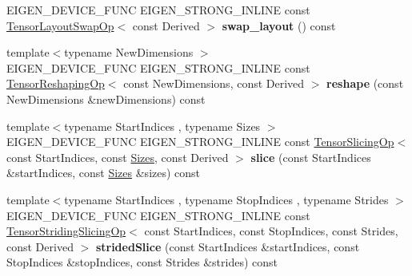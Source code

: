 \begin{DoxyCompactItemize}
E\+I\+G\+E\+N\+\_\+\+D\+E\+V\+I\+C\+E\+\_\+\+F\+U\+NC E\+I\+G\+E\+N\+\_\+\+S\+T\+R\+O\+N\+G\+\_\+\+I\+N\+L\+I\+NE const \hyperlink{class_eigen_1_1_tensor_layout_swap_op}{Tensor\+Layout\+Swap\+Op}$<$ const Derived $>$ {\bfseries swap\+\_\+layout} () const
\item 
\mbox{\label{class_eigen_1_1_tensor_base_3_01_derived_00_01_read_only_accessors_01_4_a78ac788b70a20612b37ae9b24671ecc4}} 
{\footnotesize template$<$typename New\+Dimensions $>$ }\\E\+I\+G\+E\+N\+\_\+\+D\+E\+V\+I\+C\+E\+\_\+\+F\+U\+NC E\+I\+G\+E\+N\+\_\+\+S\+T\+R\+O\+N\+G\+\_\+\+I\+N\+L\+I\+NE const \hyperlink{class_eigen_1_1_tensor_reshaping_op}{Tensor\+Reshaping\+Op}$<$ const New\+Dimensions, const Derived $>$ {\bfseries reshape} (const New\+Dimensions \&new\+Dimensions) const
\item 
\mbox{\label{class_eigen_1_1_tensor_base_3_01_derived_00_01_read_only_accessors_01_4_a923c1b75806a905ac635931cbcd89fcc}} 
{\footnotesize template$<$typename Start\+Indices , typename Sizes $>$ }\\E\+I\+G\+E\+N\+\_\+\+D\+E\+V\+I\+C\+E\+\_\+\+F\+U\+NC E\+I\+G\+E\+N\+\_\+\+S\+T\+R\+O\+N\+G\+\_\+\+I\+N\+L\+I\+NE const \hyperlink{class_eigen_1_1_tensor_slicing_op}{Tensor\+Slicing\+Op}$<$ const Start\+Indices, const \hyperlink{struct_eigen_1_1_sizes}{Sizes}, const Derived $>$ {\bfseries slice} (const Start\+Indices \&start\+Indices, const \hyperlink{struct_eigen_1_1_sizes}{Sizes} \&sizes) const
\item 
\mbox{\label{class_eigen_1_1_tensor_base_3_01_derived_00_01_read_only_accessors_01_4_ab48a52ef5cbe82786adadc43803cd6bf}} 
{\footnotesize template$<$typename Start\+Indices , typename Stop\+Indices , typename Strides $>$ }\\E\+I\+G\+E\+N\+\_\+\+D\+E\+V\+I\+C\+E\+\_\+\+F\+U\+NC E\+I\+G\+E\+N\+\_\+\+S\+T\+R\+O\+N\+G\+\_\+\+I\+N\+L\+I\+NE const \hyperlink{class_eigen_1_1_tensor_striding_slicing_op}{Tensor\+Striding\+Slicing\+Op}$<$ const Start\+Indices, const Stop\+Indices, const Strides, const Derived $>$ {\bfseries strided\+Slice} (const Start\+Indices \&start\+Indices, const Stop\+Indices \&stop\+Indices, const Strides \&strides) const
\item 

\end{DoxyCompactItemize}

